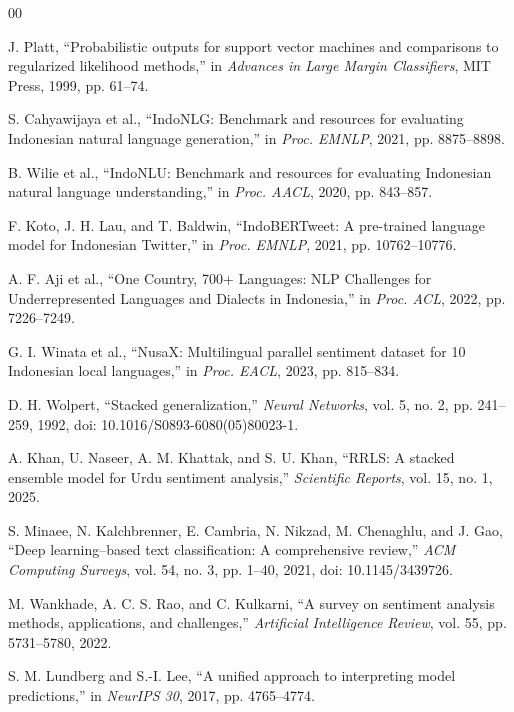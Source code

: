 \documentclass[conference]{IEEEtran}
\begin{document}
\begin{thebibliography}{00}

 J. Platt, ``Probabilistic outputs for support vector machines and comparisons to regularized likelihood methods,'' in \textit{Advances in Large Margin Classifiers}, MIT Press, 1999, pp. 61--74.

 S. Cahyawijaya et al., ``IndoNLG: Benchmark and resources for evaluating Indonesian natural language generation,'' in \textit{Proc. EMNLP}, 2021, pp. 8875--8898.

 B. Wilie et al., ``IndoNLU: Benchmark and resources for evaluating Indonesian natural language understanding,'' in \textit{Proc. AACL}, 2020, pp. 843--857.

 F. Koto, J. H. Lau, and T. Baldwin, ``IndoBERTweet: A pre-trained language model for Indonesian Twitter,'' in \textit{Proc. EMNLP}, 2021, pp. 10762--10776.

 A. F. Aji et al., ``One Country, 700+ Languages: NLP Challenges for Underrepresented Languages and Dialects in Indonesia,'' in \textit{Proc. ACL}, 2022, pp. 7226--7249.

 G. I. Winata et al., ``NusaX: Multilingual parallel sentiment dataset for 10 Indonesian local languages,'' in \textit{Proc. EACL}, 2023, pp. 815--834.

 D. H. Wolpert, ``Stacked generalization,'' \textit{Neural Networks}, vol. 5, no. 2, pp. 241--259, 1992, doi: 10.1016/S0893-6080(05)80023-1.

 A. Khan, U. Naseer, A. M. Khattak, and S. U. Khan, ``RRLS: A stacked ensemble model for Urdu sentiment analysis,'' \textit{Scientific Reports}, vol. 15, no. 1, 2025.

 S. Minaee, N. Kalchbrenner, E. Cambria, N. Nikzad, M. Chenaghlu, and J. Gao, ``Deep learning--based text classification: A comprehensive review,'' \textit{ACM Computing Surveys}, vol. 54, no. 3, pp. 1--40, 2021, doi: 10.1145/3439726.

 M. Wankhade, A. C. S. Rao, and C. Kulkarni, ``A survey on sentiment analysis methods, applications, and challenges,'' \textit{Artificial Intelligence Review}, vol. 55, pp. 5731--5780, 2022.

 S. M. Lundberg and S.-I. Lee, ``A unified approach to interpreting model predictions,'' in \textit{NeurIPS 30}, 2017, pp. 4765--4774.


\end{thebibliography}
\end{document}
